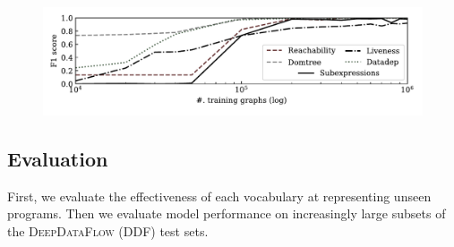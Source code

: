 \begin{figure}[!t]
\vspace{1em}
\begin{minipage}[T]{\textwidth}
    \begin{minipage}[b]{.27\linewidth}
        
        \label{tab:vocabularies}
    \end{minipage}
    \hfill
    \begin{minipage}[b]{.61\linewidth}
        \includegraphics[width=\linewidth]{images/programl-f1.pdf}
        \vspace{-2em}
        \label{fig:dataflow_convergence}
    \end{minipage}
\end{minipage}
\end{figure}

\begin{table}[t]
  \centering%
  \vspace{.4em}
  \caption{%
    Data flow analysis results. For the restricted subset DDF-30 \programl
    obtains strong results. Results on the full dataset (DDF) highlight the
    scalability challenges of MPNNs.%
  }%
  \label{table:data_flow_results} %
\end{table}

\subsection{Evaluation}

First, we evaluate the effectiveness of each vocabulary at representing unseen
programs. Then we evaluate model performance on increasingly large subsets of
the \textsc{DeepDataFlow} (DDF) test sets.

